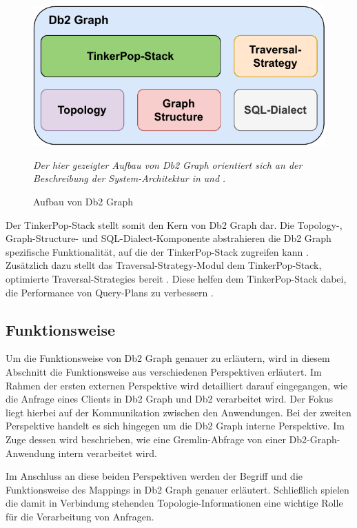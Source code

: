 \begin{figure}[!ht]
    \centering
    \includegraphics[width=\textwidth]{images/db2graph_components.pdf}
    \caption{Aufbau von Db2 Graph}
    \label{fig:db2graph_aufbau}
    \vspace{0.5em}
    \textit{Der hier gezeigter Aufbau von Db2 Graph   orientiert sich an der Beschreibung der System-Architektur in} \cite{vldb_tian} \textit{und} \cite{sigmod_tian}\textit{.}
\end{figure}

Der TinkerPop-Stack stellt somit den Kern von Db2 Graph dar. Die Topology-, Graph-Structure- und SQL-Dialect-Komponente abstrahieren die Db2 Graph spezifische Funktionalität, auf die der TinkerPop-Stack zugreifen kann \cite{sigmod_tian}. Zusätzlich dazu stellt das Traversal-Strategy-Modul dem TinkerPop-Stack, optimierte Traversal-Strategies bereit \cite{sigmod_tian}. Diese helfen dem TinkerPop-Stack dabei, die Performance von Query-Plans zu verbessern \cite{sigmod_tian}.

\subsection{Funktionsweise}
\label{db2graph:funktionsweise}
Um die Funktionsweise von Db2 Graph genauer zu erläutern, wird in diesem Abschnitt die Funktionsweise aus verschiedenen Perspektiven erläutert. Im Rahmen der ersten externen Perspektive wird detailliert darauf eingegangen, wie die Anfrage eines Clients in Db2 Graph und Db2 verarbeitet wird. Der Fokus liegt hierbei auf der Kommunikation zwischen den Anwendungen. Bei der zweiten Perspektive handelt es sich hingegen um die Db2 Graph interne Perspektive. Im Zuge dessen wird beschrieben, wie eine Gremlin-Abfrage von einer Db2-Graph-Anwendung intern verarbeitet wird. 

Im Anschluss an diese beiden Perspektiven werden der Begriff und die Funktionsweise des Mappings in Db2 Graph genauer erläutert. Schließlich spielen die damit in Verbindung stehenden Topologie-Informationen eine wichtige Rolle für die Verarbeitung von Anfragen.


